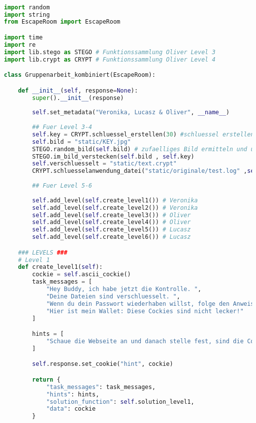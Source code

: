 \documentclass[a4paper 11pt]{article}
\begin{document}


\begin{lstlisting}[language=python, caption=der Raum]

import random
import string
from EscapeRoom import EscapeRoom

import time
import re
import lib.stego as STEGO # Funktionssammlung Oliver Level 3
import lib.crypt as CRYPT # Funktionssammlung Oliver Level 4

class Gruppenarbeit_kombiniert(EscapeRoom):

    def __init__(self, response=None):
        super().__init__(response)
        
        self.set_metadata("Veronika, Lucasz & Oliver", __name__)
        
        ## Fuer Level 3-4
        self.key = CRYPT.schluessel_erstellen(30) #schluessel erstellen
        self.bild = "static/KEY.jpg"
        STEGO.random_bild(self.bild) # zufaelliges Bild ermitteln und umkopieren
        STEGO.im_bild_verstecken(self.bild , self.key)
        self.verschluesselt = "static/text.crypt"
        CRYPT.schluesselanwendung_datei("static/originale/test.log" ,self.verschluesselt ,self.key )
        
        ## Fuer Level 5-6
        
        self.add_level(self.create_level1()) # Veronika
        self.add_level(self.create_level2()) # Veronika
        self.add_level(self.create_level3()) # Oliver
        self.add_level(self.create_level4()) # Oliver
        self.add_level(self.create_level5()) # Lucasz
        self.add_level(self.create_level6()) # Lucasz

    ### LEVELS ###
    # Level 1
    def create_level1(self):
        cockie = self.ascii_cockie()
        task_messages = [
            "Hey Buddy, ich habe jetzt die Kontrolle. ",
            "Deine Dateien sind verschluesselt. ",
            "Wenn du dein Passwort wiederhaben willst, folge den Anweisungen.",
            "Hier ist mein Wallet: Diese Cockies sind nicht lecker!"
        ]

        hints = [
            "Schaue die Webseite an und danach stelle fest, sind die Cockies lecker und was die Gangster mit ASCII zu tun haben."
        ]

        self.response.set_cookie("hint", cockie)

        return {
            "task_messages": task_messages,
            "hints": hints,
            "solution_function": self.solution_level1,
            "data": cockie
        }


\end{lstlisting}
\end{document}
